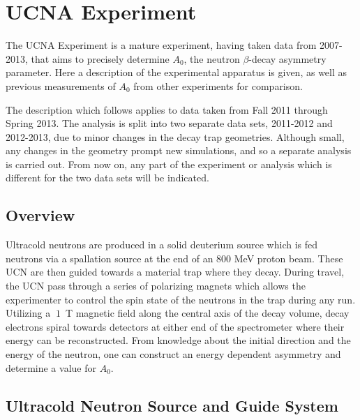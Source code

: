 \chapter{UCNA Experiment}
\label{ch:UCNA_Experiment}

The UCNA Experiment is a mature experiment, having taken data from
2007-2013, that aims to precisely determine $A_{0}$, the neutron
$\beta$-decay asymmetry parameter. Here a description of the experimental
apparatus is given, as well as previous measurements
of $A_{0}$ from other experiments for comparison.

The description which follows applies to data taken from Fall 2011 through
Spring 2013. The analysis is split into two separate data sets, 2011-2012
and 2012-2013, due to minor changes in the decay trap geometries. Although
small, any changes in the geometry prompt new simulations, and so a separate
analysis is carried out. From now on, any part of the experiment or analysis
which is different for the two data sets will be indicated.

\section{Overview}
\label{sec:Overview}

Ultracold neutrons are produced in a solid deuterium source which is fed
neutrons via a spallation source at the end of an $800$ MeV
proton beam. These UCN are then guided towards a material trap where they
decay. During travel, the UCN pass through a series of polarizing magnets
which allows the experimenter to control the spin state of the neutrons in
the trap during any run. Utilizing a $~1$~T magnetic field along the central
axis of the decay volume, decay electrons spiral towards detectors at either end of
the spectrometer where their energy can be reconstructed. From knowledge about
the initial direction and the energy of the neutron, one can construct an
energy dependent asymmetry and determine a value for $A_{0}$.

\section{Ultracold Neutron Source and Guide System}

